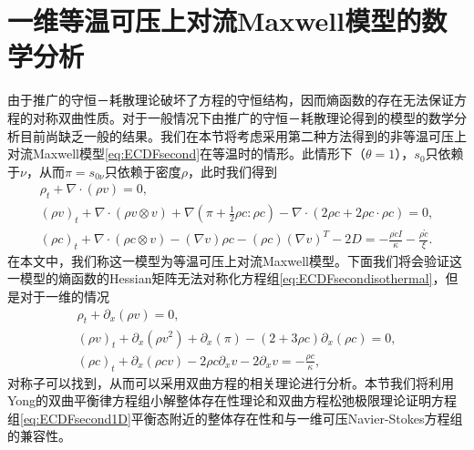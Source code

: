 \section{一维等温可压上对流Maxwell模型的数学分析}
由于推广的守恒－耗散理论破坏了方程的守恒结构，因而熵函数的存在无法保证方程的对称双曲性质。对于一般情况下由推广的守恒－耗散理论得到的模型的数学分析目前尚缺乏一般的结果。我们在本节将考虑采用第二种方法得到的非等温可压上对流Maxwell模型\eqref{eq:ECDFsecond}在等温时的情形。此情形下（$\theta=1$），$s_0$只依赖于$\nu$，从而$\pi = s_{0\nu}$只依赖于密度$\rho$，此时我们得到
	\begin{subequations} \label{eq:ECDFsecondisothermal}
		\begin{align}
			\rho_t + \nabla \cdot (\rho v) = 0 ,\\
			(\rho v)_t + \nabla \cdot (\rho v \otimes v) + \nabla (\pi + \frac{1}{2} \rho c: \rho c)  - \nabla \cdot ( 2 \rho c + 2 \rho c \cdot \rho c) =0 ,\\
			(\rho c)_t +  \nabla \cdot (\rho c \otimes v) - (\nabla v) \rho c - (\rho c) (\nabla v)^T - 2 D = - \frac{\rho \dot{c}I}{\kappa} -  \frac{\rho \mathring{c}}{\xi}  .
		\end{align}
	\end{subequations}
	在本文中，我们称这一模型为等温可压上对流Maxwell模型。下面我们将会验证这一模型的熵函数的Hessian矩阵无法对称化方程组\eqref{eq:ECDFsecondisothermal}，但是对于一维的情况
\begin{subequations} \label{eq:ECDFsecond1D}
		\begin{align}
			\rho_t + \partial_x (\rho v) = 0 ,\\
			(\rho v)_t + \partial_x (\rho v^2) + \partial_x (\pi)   -  (2+ 3 \rho c) \partial_x (  \rho c) =0 ,\\
			(\rho c)_t +  \partial_x (\rho c  v) - 2 \rho c \partial_x  v  - 2 \partial_x v = - \frac{\rho {c}}{\kappa}  ,
		\end{align}
\end{subequations}
对称子可以找到，从而可以采用双曲方程的相关理论进行分析。本节我们将利用Yong的双曲平衡律方程组小解整体存在性理论和双曲方程松弛极限理论证明方程组\eqref{eq:ECDFsecond1D}平衡态附近的整体存在性和与一维可压Navier-Stokes方程组的兼容性。

